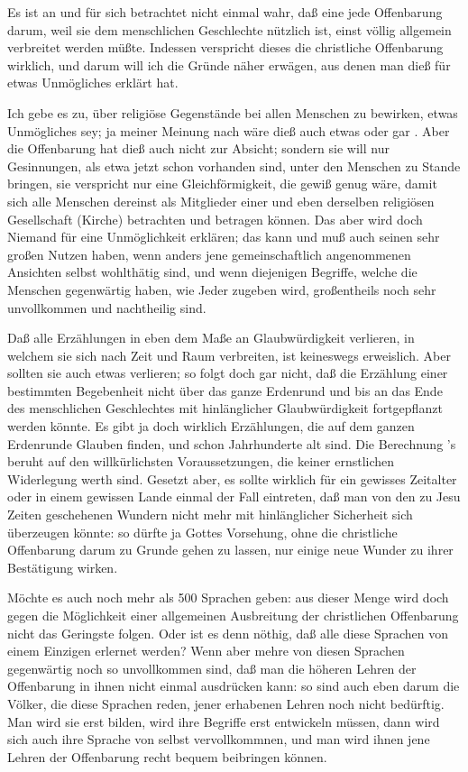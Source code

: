  Es ist an und für sich betrachtet nicht einmal wahr, daß eine jede Offenbarung darum, weil sie dem menschlichen Geschlechte nützlich ist, einst völlig allgemein verbreitet werden müßte. Indessen verspricht dieses die christliche Offenbarung wirklich, und darum will ich die Gründe näher erwägen, aus denen man dieß für etwas Unmögliches erklärt hat.
\begin{aufzb}
\item Ich gebe es zu,  über religiöse Gegenstände bei allen Menschen zu bewirken, etwas Unmögliches sey; ja meiner Meinung nach wäre dieß auch etwas  oder gar . Aber die Offenbarung hat dieß auch nicht zur Absicht; sondern sie will nur  Gesinnungen, als etwa jetzt schon vorhanden sind, unter den Menschen zu Stande bringen, sie verspricht nur eine Gleichförmigkeit, die gewiß genug wäre, damit sich alle Menschen dereinst als Mitglieder einer und eben derselben religiösen Gesellschaft (Kirche) betrachten und betragen können. Das aber wird doch Niemand für eine Unmöglichkeit erklären; das kann und muß auch seinen sehr großen Nutzen haben, wenn anders jene gemeinschaftlich angenommenen Ansichten selbst wohlthätig sind, und wenn diejenigen Begriffe, welche die Menschen gegenwärtig haben, wie Jeder zugeben wird, großentheils noch sehr unvollkommen und nachtheilig sind.~
\item Daß alle Erzählungen in eben dem Maße an Glaubwürdigkeit verlieren, in welchem sie sich nach Zeit und Raum verbreiten, ist keineswegs erweislich. Aber sollten sie auch etwas verlieren; so folgt doch gar nicht, daß die Erzählung einer bestimmten Begebenheit nicht über das ganze Erdenrund und bis an das Ende des menschlichen Geschlechtes mit hinlänglicher Glaubwürdigkeit fortgepflanzt werden könnte. Es gibt ja doch wirklich Erzählungen, die auf dem ganzen Erdenrunde Glauben finden, und schon Jahrhunderte alt sind. Die Berechnung 's beruht auf den willkürlichsten Voraussetzungen, die keiner ernstlichen Widerlegung werth sind. Gesetzt aber, es sollte wirklich für ein gewisses Zeitalter oder in einem gewissen Lande einmal der Fall eintreten, daß man von den zu Jesu Zeiten geschehenen Wundern nicht mehr mit hinlänglicher Sicherheit sich überzeugen könnte: so dürfte ja Gottes Vorsehung, ohne die christliche Offenbarung darum zu Grunde gehen zu lassen, nur einige neue Wunder zu ihrer Bestätigung wirken.
\item Möchte es auch noch mehr als 500 Sprachen geben: aus dieser Menge wird doch gegen die Möglichkeit einer allgemeinen Ausbreitung der christlichen Offenbarung nicht das Geringste folgen. Oder ist es denn nöthig, daß alle diese Sprachen von einem Einzigen erlernet werden? Wenn aber mehre von diesen Sprachen gegenwärtig noch so unvollkommen sind, daß man die höheren Lehren der Offenbarung in ihnen nicht einmal ausdrücken kann: so sind auch eben darum die Völker, die diese Sprachen reden, jener erhabenen Lehren noch nicht bedürftig. Man wird sie erst bilden, wird ihre Begriffe erst entwickeln müssen, dann wird sich auch ihre Sprache von selbst vervollkommnen, und man wird ihnen jene Lehren der Offenbarung recht bequem beibringen können.

\end{aufzb}
